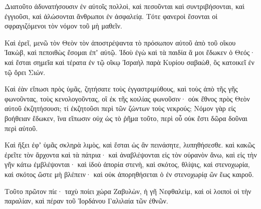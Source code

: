 {Διατοῦτο ἀδυνατήσουσιν ἐν αὐτοῖς πολλοὶ, καὶ πεσοῦνται καὶ συντριβήσονται, καὶ ἐγγιοῦσι, καὶ ἁλώσονται ἄνθρωποι ἐν ἀσφαλείᾳ.
Τότε φανεροὶ ἔσονται οἱ σφραγιζόμενοι τὸν νόμον τοῦ μὴ μαθεῖν.
\par }{\PP {}Καὶ ἐρεῖ, μενῶ τὸν Θεὸν τὸν ἀποστρέψαντα τὸ πρόσωπον αὐτοῦ ἀπὸ τοῦ οἴκου Ἰακὼβ, καὶ πεποιθὼς ἔσομαι ἐπʼ αὐτῷ.
Ἰδοὺ ἐγὼ καὶ τὰ παιδία ἅ μοι ἔδωκεν ὁ Θεός· καὶ ἔσται σημεῖα καὶ τέρατα ἐν τῷ οἴκῳ Ἰσραὴλ παρὰ Κυρίου σαβαὼθ, ὃς κατοικεῖ ἐν τῷ ὄρει Σιών.
\par }{\PP {}Καὶ ἐὰν εἴπωσι πρὸς ὑμᾶς, ζητήσατε τοὺς ἐγγαστριμύθους, καὶ τοὺς ἀπὸ τῆς γῆς φωνοῦντας, τοὺς κενολογοῦντας, οἳ ἐκ τῆς κοιλίας φωνοῦσιν· οὐκ ἔθνος πρὸς Θεὸν αὐτοῦ ἐκζητήσουσι; τί ἐκζητοῦσι περὶ τῶν ζώντων τοὺς νεκρούς;
Νόμον γὰρ εἰς βοήθειαν ἔδωκεν, ἵνα εἴπωσιν οὐχ ὡς τὸ ῥῆμα τοῦτο, περὶ οὗ οὐκ ἔστι δῶρα δοῦναι περὶ αὐτοῦ.
\par }{\PP {}Καὶ ἥξει ἐφʼ ὑμᾶς σκληρὰ λιμὸς, καὶ ἔσται ὡς ἂν πεινάσητε, λυπηθήσεσθε. καὶ κακῶς ἐρεῖτε τὸν ἄρχοντα καὶ τὰ πάτρια· καὶ ἀναβλέψονται εἰς τὸν οὐρανὸν ἄνω,
καὶ εἰς τὴν γῆν κάτω ἐμβλέψονται· καὶ ἰδοὺ ἀπορία στενὴ, καὶ σκότος, θλίψις, καὶ στενοχωρία, καὶ σκότος ὥστε μὴ βλέπειν· καὶ οὐκ ἀπορηθήσεται ὁ ἐν στενοχωρίᾳ ὢν ἕως καιροῦ.
\par }{\PP {}Τοῦτο πρῶτον πίε· ταχὺ ποίει χώρα Ζαβυλὼν, ἡ γῆ Νεφθαλεὶμ, καὶ οἱ λοιποὶ οἱ τὴν παραλίαν, καὶ πέραν τοῦ Ἰορδάνου Γαλιλαία τῶν ἐθνῶν.

}
